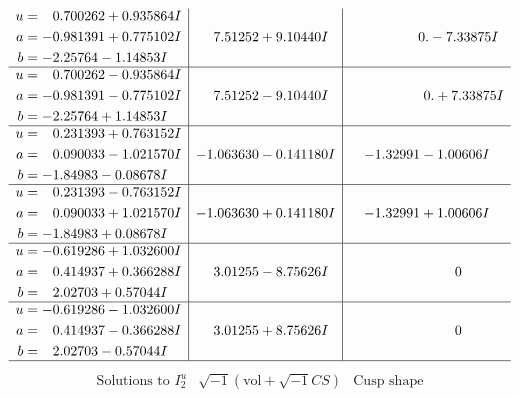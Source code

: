 \documentclass[1p]{elsarticle_modified}
\theoremstyle{definition}
\newcommand{\I}{\sqrt{-1}}
\begin{document}
$$\begin{array}{c|c|c}
\begin{aligned}
u &= \phantom{-}0.700262 + 0.935864 I \\
a &= -0.981391 + 0.775102 I \\
b &= -2.25764 - 1.14853 I\end{aligned}
 & \phantom{-}7.51252 + 9.10440 I & \phantom{-0.000000 } 0. - 7.33875 I \\ \hline\begin{aligned}
u &= \phantom{-}0.700262 - 0.935864 I \\
a &= -0.981391 - 0.775102 I \\
b &= -2.25764 + 1.14853 I\end{aligned}
 & \phantom{-}7.51252 - 9.10440 I & \phantom{-0.000000 -}0. + 7.33875 I \\ \hline\begin{aligned}
u &= \phantom{-}0.231393 + 0.763152 I \\
a &= \phantom{-}0.090033 - 1.021570 I \\
b &= -1.84983 - 0.08678 I\end{aligned}
 & -1.063630 - 0.141180 I & -1.32991 - 1.00606 I \\ \hline\begin{aligned}
u &= \phantom{-}0.231393 - 0.763152 I \\
a &= \phantom{-}0.090033 + 1.021570 I \\
b &= -1.84983 + 0.08678 I\end{aligned}
 & -1.063630 + 0.141180 I & -1.32991 + 1.00606 I \\ \hline\begin{aligned}
u &= -0.619286 + 1.032600 I \\
a &= \phantom{-}0.414937 + 0.366288 I \\
b &= \phantom{-}2.02703 + 0.57044 I\end{aligned}
 & \phantom{-}3.01255 - 8.75626 I & \phantom{-0.000000 } 0 \\ \hline\begin{aligned}
u &= -0.619286 - 1.032600 I \\
a &= \phantom{-}0.414937 - 0.366288 I \\
b &= \phantom{-}2.02703 - 0.57044 I\end{aligned}
 & \phantom{-}3.01255 + 8.75626 I & \phantom{-0.000000 } 0\\
 \hline 
 \end{array}$$\newpage$$\begin{array}{c|c|c}  
\text{Solutions to }I^u_{2}& \I (\text{vol} + \sqrt{-1}CS) & \text{Cusp shape}\\

\end{array}$$
\end{document}
